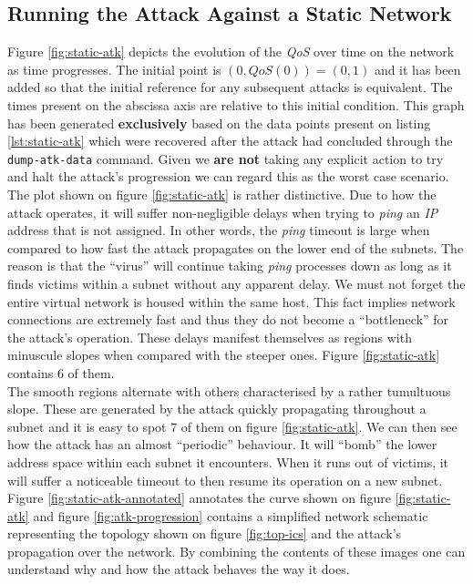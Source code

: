         \subsection{Running the Attack Against a Static Network}
            Figure \ref{fig:static-atk} depicts the evolution of the \textit{QoS} over time on the network as time progresses. The initial point is $(0, QoS(0)) = (0, 1)$ and it has been added so that the initial reference for any subsequent attacks is equivalent. The times present on the abscissa axis are relative to this initial condition. This graph has been generated \textbf{exclusively} based on the data points present on listing \ref{lst:static-atk} which were recovered after the attack had concluded through the \texttt{dump-atk-data} command. Given we \textbf{are not} taking any explicit action to try and halt the attack's progression we can regard this as the worst case scenario.\\

            The plot shown on figure \ref{fig:static-atk} is rather distinctive. Due to how the attack operates, it will suffer non-negligible delays when trying to \textit{ping} an \textit{IP} address that is not assigned. In other words, the \textit{ping} timeout is large when compared to how fast the attack propagates on the lower end of the subnets. The reason is that the ``virus'' will continue taking \textit{ping} processes down as long as it finds victims within a subnet without any apparent delay. We must not forget the entire virtual network is housed within the same host. This fact implies network connections are extremely fast and thus they do not become a ``bottleneck'' for the attack's operation. These delays manifest themselves as regions with minuscule slopes when compared with the steeper ones. Figure \ref{fig:static-atk} contains $6$ of them.\\

            The smooth regions alternate with others characterised by a rather tumultuous slope. These are generated by the attack quickly propagating throughout a subnet and it is easy to spot $7$ of them on figure \ref{fig:static-atk}. We can then see how the attack has an almost ``periodic'' behaviour. It will ``bomb'' the lower address space within each subnet it encounters. When it runs out of victims, it will suffer a noticeable timeout to then resume its operation on a new subnet.\\

            Figure \ref{fig:static-atk-annotated} annotates the curve shown on figure \ref{fig:static-atk} and figure \ref{fig:atk-progression} contains a simplified network schematic representing the topology shown on figure \ref{fig:top-ics} and the attack's propagation over the network. By combining the contents of these images one can understand why and how the attack behaves the way it does.\\

